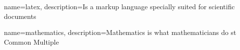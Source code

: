 \makeglossaries

{
    name=latex,
    description={Is a markup language specially suited
for scientific documents}
}

{
    name=mathematics,
    description={Mathematics is what mathematicians do}
    st Common Multiple
}
